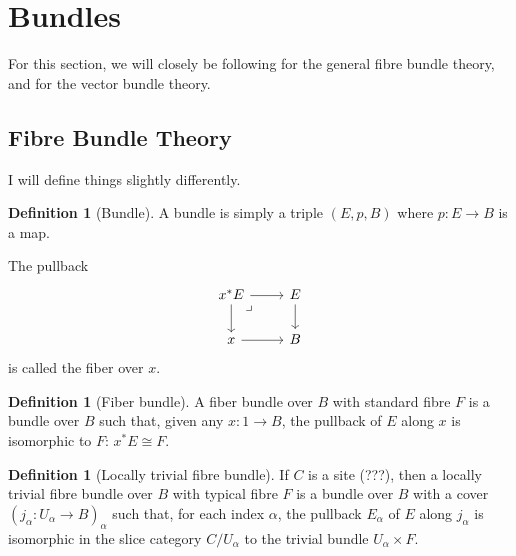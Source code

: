 \documentclass[reqno]{amsart}
\theoremstyle{definition}
\newtheorem{definition}[theorem]{Definition}
\theoremstyle{remark}
\begin{document}
\newpage
\section{Bundles}

For this section, we will closely be following
\cite{Steenrod} for the general fibre bundle theory, and
\cite{LeeSM} for the vector bundle theory. 

    \subsection{Fibre Bundle Theory}
    I will define things slightly differently.

    \begin{definition}[Bundle]
        A bundle is simply a triple
        $\left( E, p ,B \right) $ where
        $p \colon E \to B$ is a map.


        The pullback
        \begin{equation*}
        \begin{tikzcd}
            x^{*} E \ar[r] \ar[d]
            \ar[dr, phantom, "\lrcorner", very
            near start] & E \ar[d] \\
            x \ar[r] & B
        \end{tikzcd}
        \end{equation*}
        is called the fiber over $x$.
    \end{definition}

    \begin{definition}[Fiber bundle]
        A fiber bundle over $B$ with standard fibre
        $F$ is a bundle over $B$ such that, given
        any $x \colon 1 \to B$, the pullback of $E$ along
        $x$ is isomorphic to $F$: $x^{*}E \cong F$.
    \end{definition}

    \begin{definition}[Locally trivial fibre bundle]
        If $C$ is a site (???), then a locally trivial fibre
        bundle over $B$ with typical fibre $F$ is a bundle
        over $B$ with a cover 
        $\left( j_{\alpha} \colon U_{\alpha}
        \to B\right)_{\alpha}$ such that, for each
        index $\alpha$, the pullback $E_{\alpha}$ of
        $E$ along $j_{\alpha}$ is isomorphic in the slice
        category $C / U_{\alpha}$ to the trivial bundle
        $U_{\alpha} \times F$.
    \end{definition}
\end{document}

